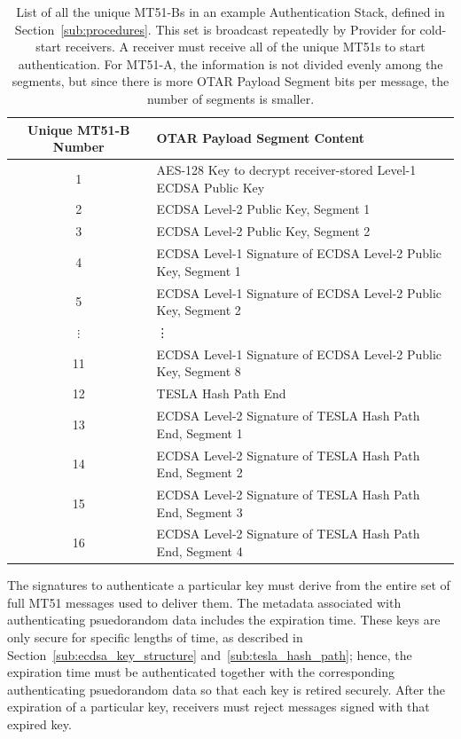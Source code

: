 \documentclass[letterpaper,times]{IONconf/IONconf}
\begin{document}
		\begin{table}%
			\center
			\begin{tabular}{|c|l|} \hline
				Unique MT51-B Number & OTAR Payload Segment Content \\ \hline
				1 & AES-128 Key to decrypt receiver-stored Level-1 ECDSA Public Key \\ \hline
				2 & ECDSA Level-2 Public Key, Segment 1 \\ \hline
				3 & ECDSA Level-2 Public Key, Segment 2 \\ \hline
				4 & ECDSA Level-1 Signature of ECDSA Level-2 Public Key, Segment 1 \\ \hline
				5 & ECDSA Level-1 Signature of ECDSA Level-2 Public Key, Segment 2 \\ \hline
				$\vdots$ & \vdots \\ \hline
				11 & ECDSA Level-1 Signature of ECDSA Level-2 Public Key, Segment 8 \\ \hline
				12 & TESLA Hash Path End \\ \hline
				13 & ECDSA Level-2 Signature of TESLA Hash Path End, Segment 1 \\ \hline
				14 & ECDSA Level-2 Signature of TESLA Hash Path End, Segment 2 \\ \hline
				15 & ECDSA Level-2 Signature of TESLA Hash Path End, Segment 3 \\ \hline
				16 & ECDSA Level-2 Signature of TESLA Hash Path End, Segment 4 \\ \hline
			\end{tabular}
			\caption{
				List of all the unique MT51-Bs in an example Authentication Stack, defined in Section~\ref{sub:procedures}.
				This set is broadcast repeatedly by Provider for cold-start receivers.
				A receiver must receive all of the unique MT51s to start authentication.
				For MT51-A, the information is not divided evenly among the segments, but since there is more OTAR Payload Segment bits per message, the number of segments is smaller. 
			}
			\label{tab: mt51-set}
		\end{table}

		The signatures to authenticate a particular key must derive from the entire set of full MT51 messages used to deliver them.
		The metadata associated with authenticating psuedorandom data includes the expiration time.
		These keys are only secure for specific lengths of time, as described in Section~\ref{sub:ecdsa_key_structure} and~\ref{sub:tesla_hash_path}; hence, the expiration time must be authenticated together with the corresponding authenticating psuedorandom data so that each key is retired securely.
		After the expiration of a particular key, receivers must reject messages signed with that expired key.
\end{document}
